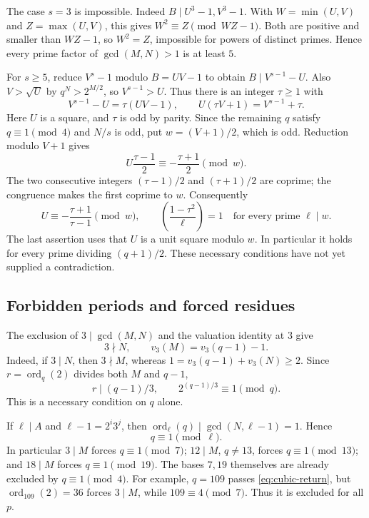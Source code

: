 \documentclass[11pt]{article}
\begin{document}
The case $s=3$ is impossible. Indeed $B\mid U^3-1,V^3-1$.
With $W=\min(U,V)$ and $Z=\max(U,V)$, this gives
$W^2\equiv Z\pmod{WZ-1}$. Both are positive and smaller than $WZ-1$,
so $W^2=Z$, impossible for powers of distinct primes. Hence every prime
factor of $\gcd(M,N)>1$ is at least $5$.

For $s\geq5$, reduce $V^s-1$ modulo $B=UV-1$ to obtain
$B\mid V^{s-1}-U$. Also $V>\sqrt U$ by $q^N>2^{M/2}$,
so $V^{s-1}>U$. Thus there is an integer $\tau\geq1$ with
\[
V^{s-1}-U=\tau(UV-1),\qquad
U(\tau V+1)=V^{s-1}+\tau.
\]
Here $U$ is a square, and $\tau$ is odd by parity. Since the remaining
$q$ satisfy $q\equiv1\pmod4$ and $N/s$ is odd, put
$w=(V+1)/2$, which is odd. Reduction modulo $V+1$ gives
\[
U\frac{\tau-1}{2}\equiv-\frac{\tau+1}{2}\pmod w.
\]
The two consecutive integers $(\tau-1)/2$ and $(\tau+1)/2$ are coprime;
the congruence makes the first coprime to $w$. Consequently
\[
U\equiv-\frac{\tau+1}{\tau-1}\pmod w,
\qquad
\left(\frac{1-\tau^2}{\ell}\right)=1
\quad\text{for every prime }\ell\mid w.
\]
The last assertion uses that $U$ is a unit square modulo $w$.
In particular it holds for every prime dividing $(q+1)/2$.
These necessary conditions have not yet supplied a contradiction.

\subsection{Forbidden periods and forced residues}
\label{sec:forbidden-periods}
The exclusion of $3\mid\gcd(M,N)$ and the valuation identity at $3$
give
\[
3\nmid N,\qquad v_3(M)=v_3(q-1)-1.
\]
Indeed, if $3\mid N$, then $3\nmid M$, whereas
$1=v_3(q-1)+v_3(N)\ge2$.
Since $r=\operatorname{ord}_q(2)$ divides both $M$ and $q-1$,
\begin{equation}\label{eq:cubic-return}
\boxed{r\mid(q-1)/3,\qquad 2^{(q-1)/3}\equiv1\pmod q.}
\end{equation}
This is a necessary condition on $q$ alone.

If $\ell\mid A$ and $\ell-1=2^i3^j$, then
$\operatorname{ord}_\ell(q)\mid\gcd(N,\ell-1)=1$. Hence
\[
q\equiv1\pmod\ell.
\]
In particular $3\mid M$ forces $q\equiv1\pmod7$;
$12\mid M$, $q\ne13$, forces $q\equiv1\pmod{13}$;
and $18\mid M$ forces $q\equiv1\pmod{19}$.
The bases $7,19$ themselves are already excluded by $q\equiv1\pmod4$.
For example, $q=109$ passes \eqref{eq:cubic-return}, but
$\operatorname{ord}_{109}(2)=36$ forces $3\mid M$, while
$109\equiv4\pmod7$. Thus it is excluded for all $p$.
\end{document}
